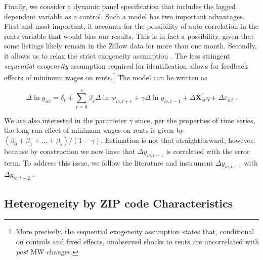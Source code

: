 
Finally, we consider a dynamic panel specification that includes the lagged dependent variable 
as a control. Such a model has two important advantages. First and most important, it accounts 
for the possibility of auto-correlation in the rents variable that would bias our results. This 
is in fact a possibility, given that some listings likely remain in the Zillow data for more 
than one month. Secondly, it allows us to relax the strict exogeneity assumption 
\parencite{ArellanoHonore2001}. The less stringent \textit{sequential exogeneity} assumption 
required for identification allows for feedback effects of minimum wages on rents.\footnote{More 
	precisely, the sequential exogeneity assumption states that, conditional on controls and 
	fixed 	effects, unobserved shocks to rents are uncorrelated with \textit{past} MW changes.}
The model can be written as

\begin{equation}\label{eq:ab_panel}
	\Delta \ln y_{ict} = \delta_t
						+ \sum_{r=0}^{s} \beta_r \Delta \ln \underline{w}_{ic,t+r}
						+ \gamma \Delta \ln y_{ic,t-1} + \Delta \mathbf{X}^{'}_{ct}\eta
						+ \Delta \varepsilon_{ict} \ .
\end{equation}

We are also interested in the parameter $\gamma$ since, per the properties of time series, the 
long run effect of minimum wages on rents is given by $(\beta_0 + \beta_1 + \dots + \beta_s)/(1-\gamma)$. 
Estimation is not that straightforward, however, because by construction we now have that 
$\Delta y_{ic,t-1}$ is correlated with the error term. To address this issue, we follow 
the literature and instrument $\Delta y_{ic,t-1}$ with $\Delta y_{ic,t-2}$ 
\parencite{ArellanoHonore2001}.

\subsection{Heterogeneity by ZIP code Characteristics}\label{sec:strategy_heterogeneity}

